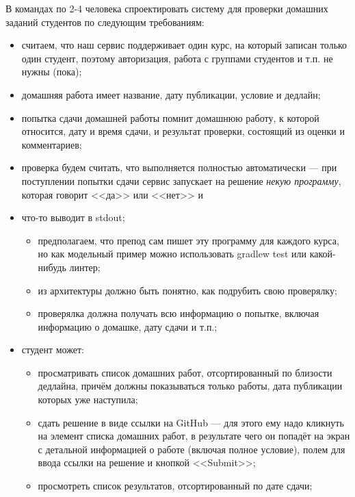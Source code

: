 \documentclass[a5paper]{homework}
\begin{document}

В командах по 2-4 человека спроектировать систему для проверки домашних заданий студентов по следующим требованиям:

\begin{itemize}
    \item считаем, что наш сервис поддерживает один курс, на который записан только один студент, поэтому авторизация, работа с группами студентов и т.п. не нужны (пока);
    \item домашняя работа имеет название, дату публикации, условие и дедлайн;
    \item попытка сдачи домашней работы помнит домашнюю работу, к которой относится, дату и время сдачи, и результат проверки, состоящий из оценки и комментариев;
    \item проверка будем считать, что выполняется полностью автоматически --- при поступлении попытки сдачи сервис запускает на решение \textit{некую программу}, которая говорит <<да>> или <<нет>> и \item{что-то} выводит в stdout;
    \begin{itemize}
        \item предполагаем, что препод сам пишет эту программу для каждого курса, но как модельный пример можно использовать gradlew test или какой-нибудь линтер;
        \item из архитектуры должно быть понятно, как подрубить свою проверялку;
        \item проверялка должна получать всю информацию о попытке, включая информацию о домашке, дату сдачи и т.п.;
    \end{itemize}
    \item студент может:
    \begin{itemize}
        \item просматривать список домашних работ, отсортированный по близости дедлайна, причём должны показываться только работы, дата публикации которых уже наступила;
        \item сдать решение в виде ссылки на GitHub --- для этого ему надо кликнуть на элемент списка домашних работ, в результате чего он попадёт на экран с детальной информацией о работе (включая полное условие), полем для ввода ссылки на решение и кнопкой <<Submit>>;
        \item просмотреть список результатов, отсортированный по дате сдачи;

\end{itemize}
\end{itemize}
\end{document}
